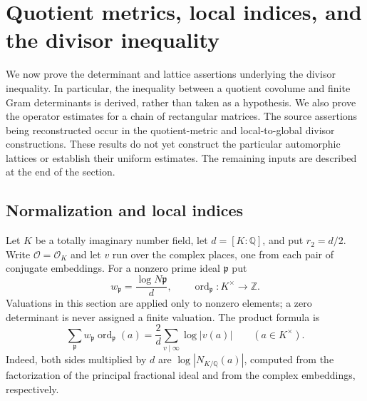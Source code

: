 \section{Quotient metrics, local indices, and the divisor inequality}
\label{div:section}

We now prove the determinant and lattice assertions underlying the divisor
inequality. In particular, the inequality between a quotient covolume and
finite Gram determinants is derived, rather than taken as a hypothesis.
We also prove the operator estimates for a chain of rectangular matrices.
The source assertions being reconstructed occur in the quotient-metric
and local-to-global divisor constructions.\cite{alpo-uniform-source}
These results do not yet construct the particular automorphic lattices or
establish their uniform estimates. The remaining inputs are described at
the end of the section.

\subsection{Normalization and local indices}

Let $K$ be a totally imaginary number field, let $d=[K:\mathbb Q]$,
and put $r_2=d/2$. Write $\mathcal O=\mathcal O_K$ and let $v$ run over
the complex places, one from each pair of conjugate embeddings. For a
nonzero prime ideal $\mathfrak p$ put
\[
 w_{\mathfrak p}=\frac{\log N\mathfrak p}{d},\qquad
 \operatorname{ord}_{\mathfrak p}:K^\times\longrightarrow\mathbb Z.
\]
Valuations in this section are applied only to nonzero elements; a zero
determinant is never assigned a finite valuation. The product formula is
\begin{equation}\label{div:product-formula}
 \sum_{\mathfrak p}w_{\mathfrak p}\operatorname{ord}_{\mathfrak p}(a)
 =\frac2d\sum_{v\mid\infty}\log|v(a)|\qquad(a\in K^\times).
\end{equation}
Indeed, both sides multiplied by $d$ are
$\log|N_{K/\mathbb Q}(a)|$, computed from the factorization of the
principal fractional ideal and from the complex embeddings, respectively.

